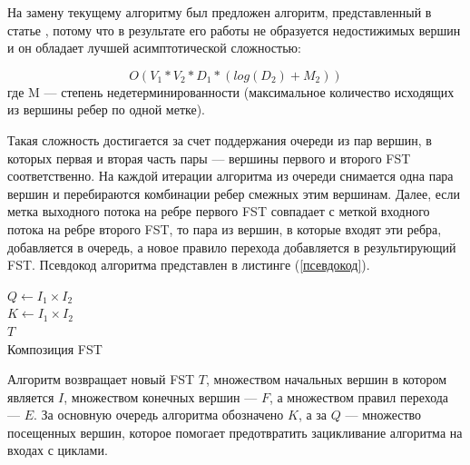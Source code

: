 \documentclass[14pt]{matmex-diploma}
\newenvironment{rualgorithm}[1][htb]
  {\renewcommand{\algorithmcfname}{Алгоритм}
   \begin{algorithm}[#1]
  }{\end{algorithm}}
\begin{document}
На замену текущему алгоритму был предложен алгоритм, представленный в статье \cite{handbook_automata}, потому что в результате его работы не образуется недостижимых вершин и он обладает лучшей асимптотической сложностью:

\[O(V_1 * V_2 * D_1 * (log(D_2) + M_2))\] где M — степень недетерминированности (максимальное количество исходящих из вершины ребер по одной метке).

Такая сложность достигается за счет поддержания очереди из пар вершин, в которых первая и вторая часть пары — вершины первого и второго FST соответственно. На каждой итерации алгоритма из очереди снимается одна пара вершин и перебираются комбинации ребер смежных этим вершинам. Далее, если метка выходного потока на ребре первого FST совпадает с меткой входного потока на ребре второго FST, то пара из вершин, в которые входят эти ребра, добавляется в очередь, а новое правило перехода добавляется в результирующий FST. Псевдокод алгоритма представлен в листинге (\ref{псевдокод}).

\begin{rualgorithm}[h]
 $Q\gets I_1\times I_2$\\
 $K\gets I_1\times I_2$\\
 \KwRet $T$\\
 \caption{Композиция FST}
 \label{псевдокод}
\end{rualgorithm}

Алгоритм возвращает новый FST $T$, множеством начальных вершин в котором является $I$, множеством конечных вершин — $F$, а множеством правил перехода — $E$. За основную очередь алгоритма обозначено $K$, а за $Q$ — множество посещенных вершин, которое помогает предотвратить зацикливание алгоритма на входах с циклами.
\end{document}
